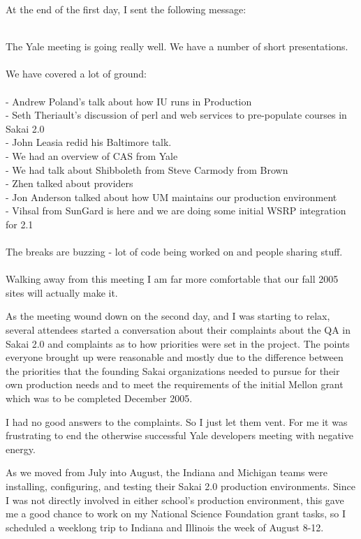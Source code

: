 \documentclass[12pt]{book}
\begin{document}
At the end of the first day, I sent the following
message:\\
\\
\begin{sf}
The Yale meeting is going really well.  We have a
number of short presentations.  \\
\\
We have covered a lot of ground:\\
\\
-  Andrew Poland's talk about how IU runs in Production\\
-  Seth Theriault's discussion of perl and web services to
   pre-populate courses in Sakai 2.0\\
-  John Leasia redid his Baltimore talk.\\
-  We had an overview of CAS from Yale\\
-  We had  talk about Shibboleth from Steve Carmody
   from Brown\\
-  Zhen talked about providers\\
-  Jon Anderson talked about how UM maintains our
   production environment\\
-  Vihsal from SunGard is here and we are doing some
   initial WSRP integration for 2.1\\
\\
The breaks are buzzing - lot of code being worked on and
people sharing stuff.\\
\\
Walking away from this meeting I am far more comfortable
that our fall 2005 sites will actually make it.\\
\end{sf}

As the meeting wound down on the second day, and
I was starting to relax,
several attendees started a conversation
about their complaints
about the QA in Sakai 2.0 and complaints as to how
priorities were set in the project.
The points everyone brought up were
reasonable and mostly due to the difference between
the priorities that the founding Sakai organizations
needed to pursue for their own production needs and
to meet the requirements of the initial Mellon grant
which was to be completed December 2005.

I had no good answers to the complaints.  So I just
let them vent.  For me it was frustrating to end the
otherwise successful Yale developers meeting with
negative energy.

As we moved from July into August, the Indiana and Michigan teams
were installing, configuring, and testing their
Sakai 2.0 production environments.   Since I was
not directly involved in either school's production
environment, this gave me a good chance to work on
my National Science Foundation grant tasks, so
I scheduled a weeklong trip to Indiana and Illinois
the week of August 8-12.
\end{document}
